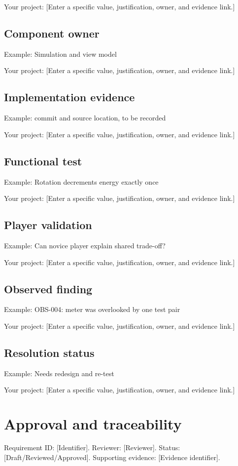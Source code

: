 \documentclass[11pt]{article}
\begin{document}
Your project: [Enter a specific value, justification, owner, and evidence link.]


\subsection{Component owner}
Example: Simulation and view model

Your project: [Enter a specific value, justification, owner, and evidence link.]


\subsection{Implementation evidence}
Example: commit and source location, to be recorded

Your project: [Enter a specific value, justification, owner, and evidence link.]


\subsection{Functional test}
Example: Rotation decrements energy exactly once

Your project: [Enter a specific value, justification, owner, and evidence link.]


\subsection{Player validation}
Example: Can novice player explain shared trade-off?

Your project: [Enter a specific value, justification, owner, and evidence link.]


\subsection{Observed finding}
Example: OBS-004: meter was overlooked by one test pair

Your project: [Enter a specific value, justification, owner, and evidence link.]


\subsection{Resolution status}
Example: Needs redesign and re-test

Your project: [Enter a specific value, justification, owner, and evidence link.]


\section{Approval and traceability}
Requirement ID: [Identifier]. Reviewer: [Reviewer]. Status: [Draft/Reviewed/Approved]. Supporting evidence: [Evidence identifier].
\end{document}
